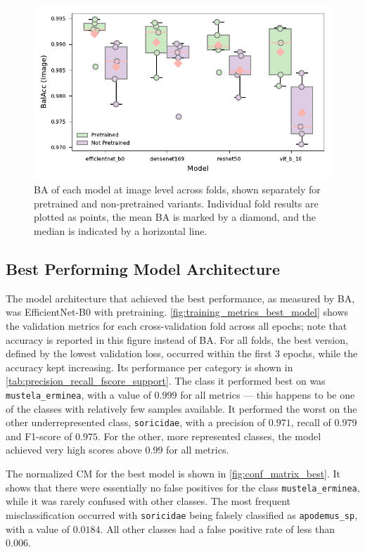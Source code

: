 \begin{figure}[ht]
\centering
\includegraphics{figures/bal_acc_img.pdf}
\caption{
    \acs{BA} of each model at image level across folds, shown separately for pretrained and non-pretrained variants.
    Individual fold results are plotted as points, the mean \acs{BA} is marked by a diamond, and the median is indicated by a horizontal line.
    }
\label{fig:bal_acc_img}
\end{figure}

\subsection{Best Performing Model Architecture}
The model architecture that achieved the best performance, as measured by \ac{BA}, was EfficientNet-B0 with pretraining.
\autoref{fig:training_metrics_best_model} shows the validation metrics for each cross-validation fold across all epochs; note that accuracy is reported in this figure instead of \ac{BA}.
For all folds, the best version, defined by the lowest validation loss, occurred within the first 3 epochs, while the accuracy kept increasing.
Its performance per category is shown in \autoref{tab:precision_recall_fscore_support}.
The class it performed best on was \texttt{mustela\_erminea}, with a value of \(0.999\) for all metrics --- this happens to be one of the classes with relatively few samples available.
It performed the worst on the other underrepresented class, \texttt{soricidae}, with a precision of \(0.971\), recall of \(0.979\) and F1-score of \(0.975\).
For the other, more represented classes, the model achieved very high scores above \(0.99\) for all metrics.

The normalized \ac{CM} for the best model is shown in \autoref{fig:conf_matrix_best}.
It shows that there were essentially no false positives for the class \texttt{mustela\_erminea}, while it was rarely confused with other classes.
The most frequent misclassification occurred with \texttt{soricidae} being falsely classified as \texttt{apodemus\_sp}, with a value of \(0.0184\).
All other classes had a false positive rate of less than \(0.006\).

